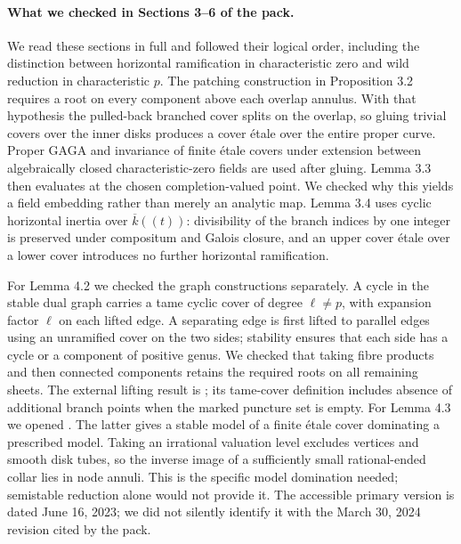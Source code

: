 \paragraph{What we checked in Sections 3--6 of the pack.}
We read these sections in full and followed their logical order, including
the distinction between horizontal ramification in characteristic zero and
wild reduction in characteristic $p$.
The patching construction in Proposition 3.2 requires a root on every
component above each overlap annulus.  With that hypothesis the pulled-back
branched cover splits on the overlap, so gluing trivial covers over the inner
disks produces a cover \'etale over the entire proper curve.  Proper GAGA and
invariance of finite \'etale covers under extension between algebraically
closed characteristic-zero fields are used after gluing.  Lemma 3.3 then
evaluates at the chosen completion-valued point.  We checked why this yields
a field embedding rather than merely an analytic map.  Lemma 3.4 uses cyclic
horizontal inertia over $\overline k((t))$: divisibility of the branch indices
by one integer is preserved under compositum and Galois closure, and an
upper cover \'etale over a lower cover introduces no further horizontal
ramification.

For Lemma 4.2 we checked the graph constructions separately.  A cycle in the
stable dual graph carries a tame cyclic cover of degree $\ell\ne p$, with
expansion factor $\ell$ on each lifted edge.  A separating edge is first
lifted to parallel edges using an unramified cover on the two sides; stability
ensures that each side has a cycle or a component of positive genus.
We checked that taking fibre products and then connected components retains
the required roots on all remaining sheets.  The external lifting result is
\citet[Theorem 7.7]{ABBR2015}; its tame-cover definition includes absence of
additional branch points when the marked puncture set is empty.
For Lemma 4.3 we opened \citet[Theorem A and Proposition 2.4(iv)]{MochizukiTsujimura2024}.
The latter gives a stable model of a finite \'etale cover dominating a prescribed
model.  Taking an irrational valuation level excludes vertices and smooth
disk tubes, so the inverse image of a sufficiently small rational-ended
collar lies in node annuli.  This is the specific model domination needed;
semistable reduction alone would not provide it.  The accessible primary
version is dated June 16, 2023; we did not silently identify it with the
March 30, 2024 revision cited by the pack.

